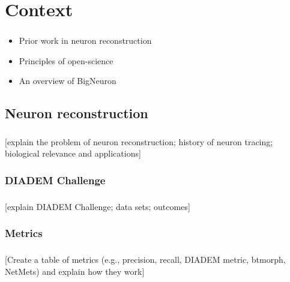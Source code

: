 \documentclass{beamer}
\newcommand{\tbackground}[1]{#1}
\newcommand{\tbackground}[1]{\textcolor{tbackground}{#1}}
\begin{document}
\section{Context}
\begin{frame}\frametitle{\secname}
	\tbackground{%
	\begin{itemize}
		\item Prior work in \alert{neuron reconstruction}
		\item Principles of \alert{open-science}
		\item An overview of \alert{BigNeuron}
	\end{itemize}
	}
\end{frame}

\subsection{Neuron reconstruction}
\begin{frame}\frametitle{\subsecname}
	[\tbackground{explain the problem of neuron reconstruction; history of
	neuron tracing; biological relevance and applications}]
\end{frame}

\subsubsection{DIADEM Challenge}
\begin{frame}\frametitle{\subsubsecname}
	[\tbackground{explain DIADEM Challenge; data sets; outcomes}]
\end{frame}

\subsubsection{Metrics}
\begin{frame}\frametitle{\subsubsecname}
	[\tbackground{Create a table of metrics (e.g., precision, recall,
	DIADEM metric, btmorph, NetMets) and explain how they work}]
\end{frame}
\end{document}
